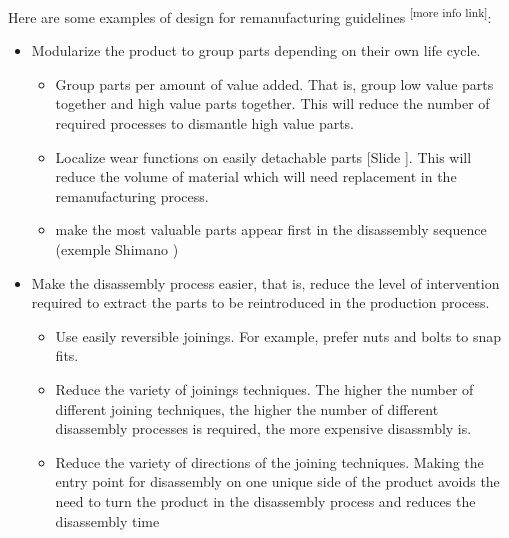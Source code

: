 \documentclass{article}
\newcounter{slide}
\begin{document}
Here are some examples of design for remanufacturing guidelines {\color{red}\textsuperscript{[more info link]}}:
\begin{itemize}
	\item Modularize the product to group parts depending on their own life cycle. 
	\begin{itemize}
		\item Group parts per amount of value added. That is, group low value parts together and high value parts together. This will reduce the number of required processes to dismantle high value parts. 
		\item Localize wear functions on easily detachable parts {\color{blue}[Slide ]}. This will reduce the volume of material which will need replacement in the remanufacturing process.
		\item {make the most valuable parts appear first in the disassembly sequence (exemple Shimano )}
	\end{itemize}
	\item Make the disassembly process easier, that is, reduce the level of intervention required to extract the parts to be reintroduced in the production process.
	\begin{itemize}
    \item Use easily reversible joinings. For example, prefer nuts and bolts to snap fits.
		\item Reduce the variety of joinings techniques. The higher the number of different joining techniques, the higher the number of different disassembly processes is required, the more expensive disassmbly is. 
		\item Reduce the variety of directions of the joining techniques. Making the entry point for disassembly on one unique side of the product avoids the need to turn the product in the disassembly process and reduces the disassembly time
	\end{itemize}
\end{itemize}
\end{document}
